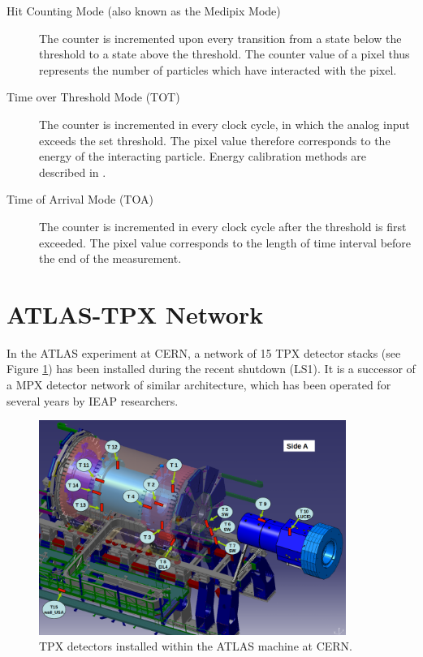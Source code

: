\begin{description}
	\item[Hit Counting Mode (also known as the Medipix Mode)]
	The counter is incremented upon every transition from a state below the threshold to a state above the threshold. The counter value of a pixel thus represents the number of particles which have interacted with the pixel.

	\item[Time over Threshold Mode (TOT)]\label{tpx:tot}
	The counter is incremented in every clock cycle, in which the analog input exceeds the set threshold. The pixel value therefore corresponds to the energy of the interacting particle. Energy calibration methods are described in \cite{EnergyCalibration}.

	\item[Time of Arrival Mode (TOA)]\label{tpx:toa}
	The counter is incremented in every clock cycle after the threshold is first exceeded. The pixel value corresponds to the length of time interval before the end of the measurement.
\end{description}

\section{ATLAS-TPX Network}
In the ATLAS experiment at CERN, a network of 15 TPX detector stacks (see Figure \ref{fig:tpx-positions-atlas}) has been installed during the recent shutdown (LS1). It is a successor of a MPX detector network \cite{RemoteControl} of similar architecture, which has been operated for several years by IEAP researchers.

\begin{figure}[t]
\begin{center}
	\includegraphics[height=7cm]{figures/imported/tpx_positions}
\caption{TPX detectors installed within the ATLAS machine at CERN.}
\label{fig:tpx-positions-atlas}
\end{center}
\end{figure}


